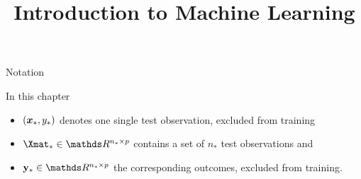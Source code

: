 




\newcommand{\titlefigure}{figure_man/post-mean.png} %
\newcommand{\learninggoals}{
  \item \textcolor{blue}{XXX}
  \item \textcolor{blue}{XXX}
}

\title{Introduction to Machine Learning}
\date{}





\begin{vbframe}{Notation}
% 
% 
% 
% 
% 

In this chapter 

\begin{itemize}
\item $(\bm{x}_*, y_*)$ denotes one single test observation, excluded from training
\item $\Xmat_* \in \R^{n_* \times p}$ contains a set of $n_*$ test observations and  
\item $\ydat_* \in \R^{n_* \times p}$ the corresponding outcomes, excluded from training. 
\end{itemize}





\end{vbframe}

